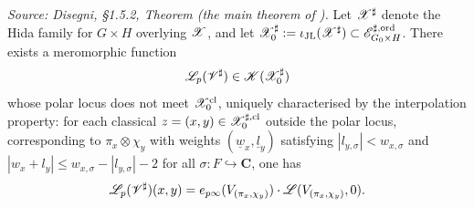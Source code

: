 \begin{definition}
  \label{def:PAdicLFunction}
%
%
  \textit{Source: Disegni, §1.5.2, Theorem (the main theorem of \cite{dd-pLf}).}
  Let $\mathscr{X}^\sharp$ denote the Hida family for $G \times H$ overlying
  $\mathscr{X}$, and let $\mathscr{X}_0^\sharp := \iota_{\mathrm{JL}}(\mathscr{X}^\sharp)
  \subset \mathscr{E}^{\sharp,\mathrm{ord}}_{G_0 \times H}$.  There exists a meromorphic
  function
  \[
    \mathscr{L}_p(\mathscr{V}^\sharp) \in \mathscr{K}(\mathscr{X}_0^\sharp)
  \]
  whose polar locus does not meet $\mathscr{X}_0^{\mathrm{cl}}$, uniquely
  characterised by the interpolation property: for each classical
  $z = (x,y) \in \mathscr{X}_0^{\sharp,\mathrm{cl}}$ outside the polar locus,
  corresponding to $\pi_x \otimes \chi_y$ with weights $(\underline{w}_x,
  \underline{l}_y)$ satisfying $|l_{y,\sigma}| < w_{x,\sigma}$ and
  $|w_x + l_y| \leq w_{x,\sigma} - |l_{y,\sigma}| - 2$ for all
  $\sigma \colon F \hookrightarrow \mathbf{C}$, one has
  \[
    \mathscr{L}_p(\mathscr{V}^\sharp)(x,y)
    = e_{p\infty}(V_{(\pi_x, \chi_y)}) \cdot
    \mathscr{L}(V_{(\pi_x, \chi_y)}, 0).
  \]
\end{definition}

